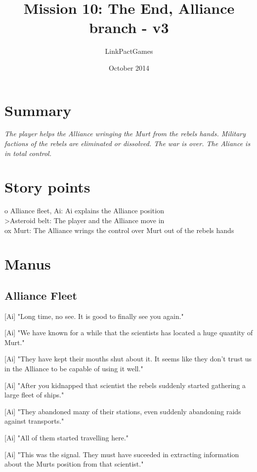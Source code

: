 \documentclass[a4paper,12pt]{article}
\begin{document}
\title{Mission 10: The End, Alliance branch - v3}
\author{LinkPactGames}
\date{October 2014}
\maketitle

\section{Summary}

\textit{The player helps the Alliance wringing the Murt from the rebels hands. Military factions
of the rebels are eliminated or dissolved. The war is over. The Aliance is in total control.}

\section{Story points}

o Alliance fleet, Ai: Ai explains the Alliance position\\
\textgreater Asteroid belt: The player and the Alliance move in\\
ox Murt: The Alliance wrings the control over Murt out of the rebels hands\\

\section{Manus}

\subsection{Alliance Fleet}

[Ai] "Long time, no see. It is good to finally see you again."

[Ai] "We have known for a while that the scientists has located a huge quantity of Murt."

[Ai] "They have kept their mouths shut about it. It seems like they don't trust us in the Alliance to be capable
of using it well."

[Ai] "After you kidnapped that scientist the rebels suddenly started gathering a large fleet of ships." 

[Ai] "They abandoned many of their stations, even suddenly abandoning raids against transports."

[Ai] "All of them started travelling here."

[Ai] "This was the signal. They must have suceeded in extracting information about the Murts position from that scientist."
\end{document}
